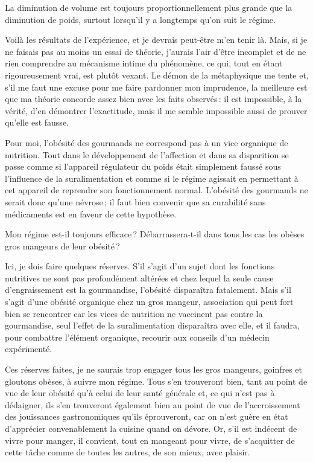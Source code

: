 La diminution de volume est toujours proportionnellement plus grande que la
diminution de poids, surtout lorsqu'il y a longtemps qu'on suit le régime.

\sk

Voilà les résultats de l'expérience, et je devrais peut-être m'en tenir là.
Mais, si je ne faisais pas au moins un essai de théorie, j'aurais l'air d’être
incomplet et de ne rien comprendre au mécanisme intime du phénomène, ce qui,
tout en étant rigoureusement vrai, est plutôt vexant. Le démon de la
métaphysique me tente et, s'il me faut une excuse pour me faire pardonner mon
imprudence, la meilleure est que ma théorie concorde assez bien avec les faits
observés : il est impossible, à la vérité, d'en démontrer l'exactitude, mais il
me semble impossible aussi de prouver qu'elle est fausse.

Pour moi, l'obésité des gourmands ne correspond pas à un vice organique de
nutrition. Tout dans le développement de l'affection et dans sa disparition se
passe comme si l'appareil régulateur du poids était simplement faussé sous
l'influence de la suralimentation et comme si le régime agissait en permettant
à cet appareil de reprendre son fonctionnement normal. L'obésité des gourmands
ne serait donc qu'une névrose ; il faut bien convenir que sa curabilité sans
médicaments est en faveur de cette hypothèse.

\sk

Mon régime est-il toujours efficace ? Débarrassera-t-il dans tous les cas les
obèses gros mangeurs de leur obésité ?

Ici, je dois faire quelques réserves. S'il s'agit d’un sujet dont les fonctions
nutritives ne sont pas profondément altérées et chez lequel la seule cause
d'engraissement est la gourmandise, l'obésité disparaîtra fatalement. Mais s'il
s'agit d'une obésité organique chez un gros mangeur, association qui peut fort
bien se rencontrer car les vices de nutrition ne vaccinent pas contre la
gourmandise, seul l'effet de la suralimentation disparaîtra avec elle, et il
faudra, pour combattre l'élément organique, recourir aux conseils d'un médecin
expérimenté.

Ces réserves faites, je ne saurais trop engager tous les gros mangeurs,
goinfres et gloutons obèses, à suivre mon régime. Tous s'en trouveront bien,
tant au point de vue de leur obésité qu'à celui de leur santé générale et, ce
qui n'est pas à dédaigner, ils s'en trouveront également bien au point de vue
de l'accroissement des jouissances gastronomiques qu'ils éprouveront, car on
n'est guère en état d'apprécier convenablement la cuisine quand on dévore.
Or, s'il est indécent de vivre pour manger, il convient, tout en mangeant pour
vivre, de s'acquitter de cette tâche comme de toutes les autres, de son mieux,
avec plaisir.
